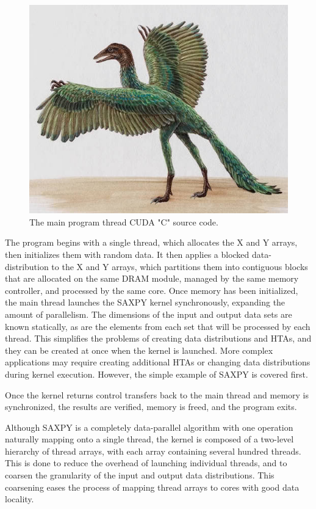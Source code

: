 \documentclass[conference, 10pt]{IEEEtran}
\begin{document}
\begin{figure}
	\begin{center}
		\includegraphics[width=0.9\linewidth]{archaeopteryx-bird}
		\caption{The main program thread CUDA "C" source code.}
		\label{fig:saxpy-main-thread}
	\end{center}
\end{figure}

The program begins with a single thread, which allocates the X and Y arrays,
then initializes them with random data.  It then applies a blocked
data-distribution to the X and Y arrays, which partitions them into contiguous
blocks that are allocated on the same DRAM module, managed by the same memory
controller, and processed by the same core.  Once memory has been initialized,
the main thread launches the SAXPY kernel synchronously, expanding the amount
of parallelism.  The dimensions of the input and output data sets are known
statically, as are the elements from each set that will be processed by each
thread.  This simplifies the problems of creating data distributions and HTAs,
and they can be created at once when the kernel is launched.  More complex
applications may require creating additional HTAs or changing data distributions
during kernel execution.  However, the simple example of SAXPY is covered first.  

Once the kernel returns control transfers back to the main thread and
memory is synchronized, the results are verified, memory is freed, and the
program exits.  

Although SAXPY is a completely data-parallel algorithm with one operation
naturally mapping onto a single thread, the kernel is composed of a two-level
hierarchy of thread arrays, with each array containing several hundred threads.
This is done to reduce the overhead of launching individual threads, and to
coarsen the granularity of the input and output data distributions.  This
coarsening eases the process of mapping thread arrays to cores with good data
locality.
\end{document}
